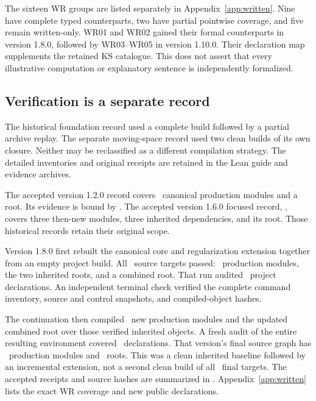 The sixteen WR groups are listed separately in Appendix~\ref{app:written}. Nine have complete typed counterparts, two have partial pointwise coverage, and five remain written-only. WR01 and WR02 gained their formal counterparts in version 1.8.0, followed by WR03--WR05 in version 1.10.0. Their declaration map supplements the retained KS catalogue. This does not assert that every illustrative computation or explanatory sentence is independently formalized.



\subsection{Verification is a separate record}
The historical foundation record used a complete build followed by a partial archive replay. The separate moving-space record used two clean builds of its own closure. Neither may be reclassified as a different compilation strategy. The detailed inventories and original receipts are retained in the Lean guide and evidence archives.

The accepted version 1.2.0 record covers \EditionFormalModules\ canonical production modules and a root. Its evidence is bound by . The accepted version 1.6.0 focused record, , covers three then-new modules, three inherited dependencies, and its root. Those historical records retain their original scope.

Version 1.8.0 first rebuilt the canonical core and regularization extension together from an empty project build. All \EditionCumulativeBaseTargets\ source targets passed: \EditionCumulativeBaseModules\ production modules, the two inherited roots, and a combined root. That run audited \EditionCumulativeBaseDeclarations\ project declarations. An independent terminal check verified the complete command inventory, source and control snapshots, and compiled-object hashes.

The continuation then compiled \EditionContinuationModules\ new production modules and the updated combined root over those verified inherited objects. A fresh audit of the entire resulting environment covered \EditionCumulativeDeclarations\ declarations. That version's final source graph has \EditionCumulativeModules\ production modules and \EditionCumulativeRoots\ roots. This was a clean inherited baseline followed by an incremental extension, not a second clean build of all \EditionCumulativeTargets\ final targets. The accepted receipts and source hashes are summarized in . Appendix~\ref{app:written} lists the exact WR coverage and new public declarations.

